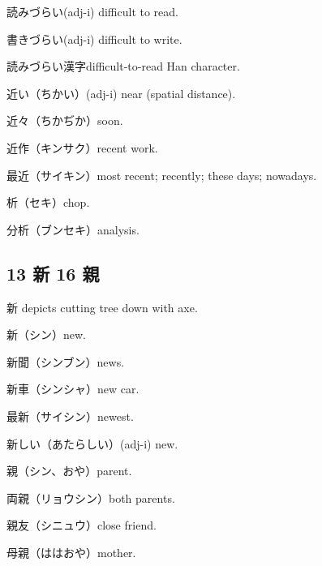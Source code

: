 読みづらい(adj-i) difficult to read.

書きづらい(adj-i) difficult to write.

読みづらい漢字difficult-to-read Han character.

近い（ちかい）(adj-i) near (spatial distance).

近々（ちかぢか）soon.

近作（キンサク）recent work.

最近（サイキン）most recent; recently; these days; nowadays.

析（セキ）chop.

分析（ブンセキ）analysis.

\subsection{13 新 16 親}

新 depicts cutting tree down with axe.

新（シン）new.

新聞（シンブン）news.

新車（シンシャ）new car.

最新（サイシン）newest.

新しい（あたらしい）(adj-i) new.

親（シン、おや）parent.

両親（リョウシン）both parents.

親友（シニュウ）close friend.

母親（ははおや）mother.
